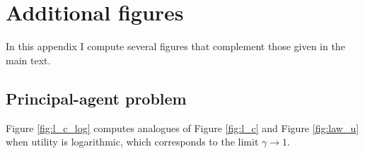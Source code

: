 \documentclass[11pt]{article}
\theoremstyle{plain}
\begin{document}

\section{Additional figures} \label{sec:add_figures}

In this appendix I compute several figures that complement those given in the main text. 

\subsection{Principal-agent problem}

Figure \ref{fig:l_c_log} computes analogues of Figure \ref{fig:l_c} and Figure \ref{fig:law_u} when utility is logarithmic, which corresponds to the limit $\gamma \rightarrow 1$.
\end{document}
